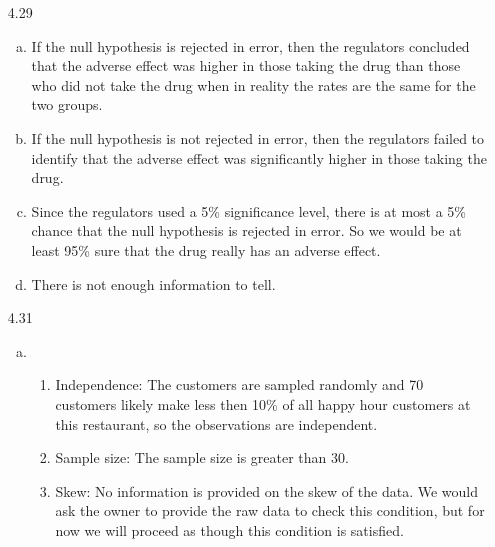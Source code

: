 \documentclass[11pt]{article}
\begin{document}
\begin{enumerate}
\item[4.29]
\begin{enumerate}[(a)]
\item If the null hypothesis is rejected in error, then the regulators concluded that the adverse effect was higher in those taking the drug than those who did not take the drug when in reality the rates are the same for the two groups. 
\item If the null hypothesis is not rejected in error, then the regulators failed to identify that the adverse effect was significantly higher in those taking the drug.
\item Since the regulators used a 5\% significance level, there is at most a 5\% chance that the null hypothesis is rejected in error. So we would be at least 95\% sure that the drug really has an adverse effect. 
\item There is not enough information to tell.
\end{enumerate}

%

\item[4.31]$\:$ \\
\begin{enumerate}[(a)]

\item 
\begin{enumerate}[1.]
\item Independence: The customers are sampled randomly and 70 customers likely make less then 10\% of all happy hour customers at this restaurant, so the observations are independent.
\item Sample size: The sample size is greater than 30.
\item Skew: No information is provided on the skew of the data. We would ask the owner to provide the raw data to check this condition, but for now we will proceed as though this condition is satisfied.
\end{enumerate}


\end{enumerate}
\end{enumerate}
\end{document}

